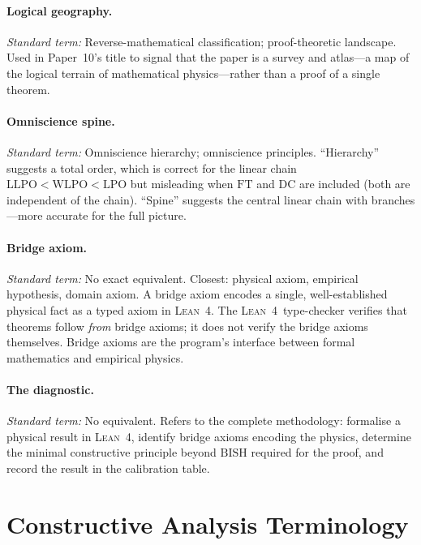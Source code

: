 \documentclass[11pt,a4paper]{report}
\theoremstyle{plain}
\theoremstyle{definition}
\theoremstyle{remark}
\newcommand{\BISH}{\mathrm{BISH}}
\newcommand{\LLPO}{\mathrm{LLPO}}
\newcommand{\WLPO}{\mathrm{WLPO}}
\newcommand{\LPO}{\mathrm{LPO}}
\newcommand{\FT}{\mathrm{FT}}
\newcommand{\DC}{\mathrm{DC}}
\newcommand{\Lean}{\textsc{Lean~4}}
\begin{document}
\paragraph{Logical geography.}
\emph{Standard term:} Reverse-mathematical classification; proof-theoretic landscape.\quad
Used in Paper~10's title to signal that the paper is a survey and atlas---a map of the logical terrain of mathematical physics---rather than a proof of a single theorem.

\paragraph{Omniscience spine.}
\emph{Standard term:} Omniscience hierarchy; omniscience principles.\quad
``Hierarchy'' suggests a total order, which is correct for the linear chain $\LLPO < \WLPO < \LPO$ but misleading when $\FT$ and $\DC$ are included (both are independent of the chain).  ``Spine'' suggests the central linear chain with branches---more accurate for the full picture.

\paragraph{Bridge axiom.}
\emph{Standard term:} No exact equivalent.  Closest: physical axiom, empirical hypothesis, domain axiom.\quad
A bridge axiom encodes a single, well-established physical fact as a typed axiom in \Lean.  The \Lean\ type-checker verifies that theorems follow \emph{from} bridge axioms; it does not verify the bridge axioms themselves.  Bridge axioms are the program's interface between formal mathematics and empirical physics.

\paragraph{The diagnostic.}
\emph{Standard term:} No equivalent.\quad
Refers to the complete methodology: formalise a physical result in \Lean, identify bridge axioms encoding the physics, determine the minimal constructive principle beyond $\BISH$ required for the proof, and record the result in the calibration table.

\section{Constructive Analysis Terminology}
\end{document}
